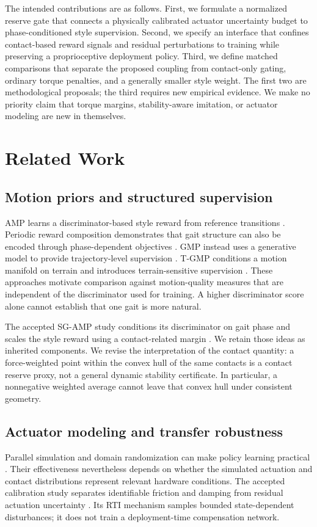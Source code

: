 \documentclass[11pt,a4paper]{article}
\begin{document}
The intended contributions are as follows. First, we formulate a normalized reserve gate that connects a physically calibrated actuator uncertainty budget to phase-conditioned style supervision. Second, we specify an interface that confines contact-based reward signals and residual perturbations to training while preserving a proprioceptive deployment policy. Third, we define matched comparisons that separate the proposed coupling from contact-only gating, ordinary torque penalties, and a generally smaller style weight. The first two are methodological proposals; the third requires new empirical evidence. We make no priority claim that torque margins, stability-aware imitation, or actuator modeling are new in themselves.

\section{Related Work}
\subsection{Motion priors and structured supervision}
AMP learns a discriminator-based style reward from reference transitions \cite{amp}. Periodic reward composition demonstrates that gait structure can also be encoded through phase-dependent objectives \cite{periodic}. GMP instead uses a generative model to provide trajectory-level supervision \cite{gmp}. T-GMP conditions a motion manifold on terrain and introduces terrain-sensitive supervision \cite{tgmp}. These approaches motivate comparison against motion-quality measures that are independent of the discriminator used for training. A higher discriminator score alone cannot establish that one gait is more natural.

The accepted SG-AMP study conditions its discriminator on gait phase and scales the style reward using a contact-related margin \cite{priorSG}. We retain those ideas as inherited components. We revise the interpretation of the contact quantity: a force-weighted point within the convex hull of the same contacts is a contact reserve proxy, not a general dynamic stability certificate. In particular, a nonnegative weighted average cannot leave that convex hull under consistent geometry.

\subsection{Actuator modeling and transfer robustness}
Parallel simulation and domain randomization can make policy learning practical \cite{rudin,isaacgym}. Their effectiveness nevertheless depends on whether the simulated actuation and contact distributions represent relevant hardware conditions. The accepted calibration study separates identifiable friction and damping from residual actuation uncertainty \cite{priorRTI}. Its RTI mechanism samples bounded state-dependent disturbances; it does not train a deployment-time compensation network.
\end{document}
